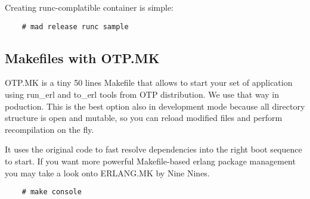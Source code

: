 Creating runc-complatible container is simple:

\vspace{1\baselineskip}
\begin{lstlisting}
    # mad release runc sample
\end{lstlisting}
\vspace{1\baselineskip}

\subsection{Makefiles with OTP.MK}

OTP.MK is a tiny 50 lines Makefile that allows to start your set
of application using run\_erl and to\_erl tools from OTP distribution.
We use that way in poduction. This is the best option also in
development mode because all directory structure is open and mutable,
so you can reload modified files and perform recompilation on the fly.

It uses the original code to fast resolve dependencies into the right
boot sequence to start. If you want more powerful Makefile-based erlang
package management you may take a look onto ERLANG.MK by Nine Nines.

\vspace{1\baselineskip}
\begin{lstlisting}
    # make console
\end{lstlisting}
\vspace{1\baselineskip}

